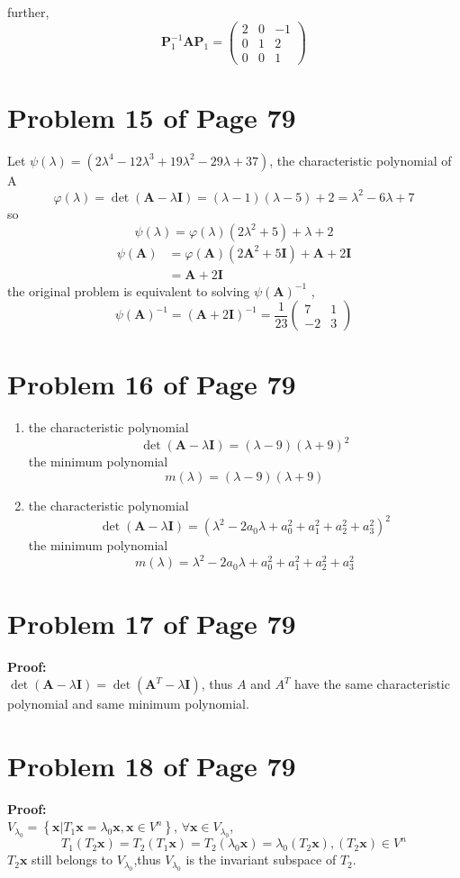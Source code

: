 \documentclass[12pt,a4paper]{article}
\newcommand{\mysection}[2]{
\section{Problem #1 of Page #2}	
	}
\begin{document}
further,
\[
\bm{P}_1^{-1}\bm{AP}_1 = \left( \begin{array}{ccc}
2 &    0 &   -1 \\
0 &    1 &    2 \\
0 &    0 &    1
\end{array}  
\right) 
\]
\mysection{15}{79}
Let $\psi(\lambda) = (2\lambda^{4} - 12\lambda^{3} + 19 \lambda^{2} - 29\lambda + 37)$,
the characteristic polynomial of A \\
\[
\varphi(\lambda) = \det(\bm{A} - \lambda\bm{I}) = (\lambda - 1)(\lambda - 5) + 2 
= \lambda^{2} - 6\lambda + 7
\]
so 
\[
\psi(\lambda) = \varphi(\lambda)(2\lambda^{2} + 5) + \lambda + 2
\] 
\[
\begin{split}
\psi(\bm{A}) &= \varphi(\bm{A})(2\bm{A}^{2} + 5\bm{I}) + \bm{A} + 2\bm{I} \\
&= \bm{A} + 2\bm{I}
\end{split} 
\] 
the original problem is equivalent to  solving ${\psi(\bm{A})}^{-1} $ ,
\[
\psi(\bm{A})^{-1} = (\bm{A}+2\bm{I})^{-1} = \frac{1}{23}\left( \begin{array}{cc}
7 & 1 \\
-2 & 3
\end{array} 
\right) 
\]
\mysection{16}{79}
\begin{enumerate}[(1)]
	\item the characteristic polynomial 
	\[
		\det(\bm{A} - \lambda\bm{I}) = (\lambda - 9)(\lambda + 9)^{2}
	\]
	the minimum polynomial 
	\[
	m(\lambda) = (\lambda - 9)(\lambda + 9)  
	\]
	\item the characteristic polynomial 
	\[
	\det(\bm{A} - \lambda\bm{I}) = (\lambda^2- 2a_0\lambda + a_0^2 + a_1^2 + a_2^2 + a_3^2)^2
	\]
	the minimum polynomial 
	\[
	m(\lambda) = \lambda^2- 2a_0\lambda + a_0^2 + a_1^2 + a_2^2 + a_3^2
	\]
\end{enumerate}

\mysection{17}{79}
\textbf{Proof:} \\
\indent $\det(\bm{A} - \lambda\bm{I}) = \det(\bm{A}^{T} - \lambda \bm{I})$,
thus $A$ and $A^{T}$ have the same characteristic polynomial
and same minimum polynomial.
\mysection{18}{79}
\textbf{Proof:}  \\
\indent $V_{\lambda_0} = \left\lbrace \bm{x} | T_1\bm{x} = \lambda_0\bm{x},\bm{x} \in V^{n} \right\rbrace$,
$\forall \bm{x} \in V_{\lambda_0}$, 
\[
T_1(T_2\bm{x}) = T_2(T_1\bm{x}) = T_2(\lambda_0 \bm{x}) = \lambda_0 (T_2\bm{x}),(T_2\bm{x})\in V^{n}
\]
$T_2\bm{x}$ still belongs to $V_{\lambda_0}$,thus $V_{\lambda_0}$ is the invariant subspace of $T_2$.
\end{document}
